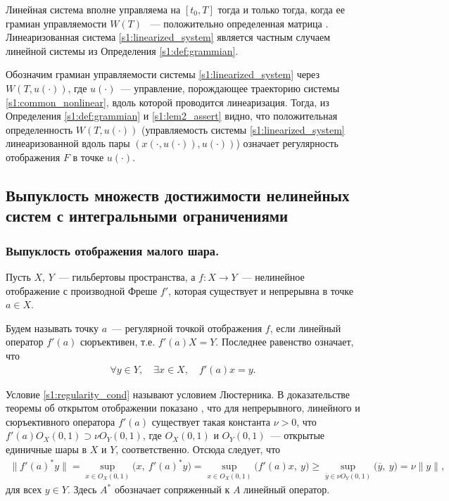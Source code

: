 \documentclass[../main.tex]{subfiles}
\begin{document}
Линейная система вполне управляема на  $ [t_0, T] $ тогда и только тогда, когда ее грамиан управляемости $W(T)$ ~--- положительно определенная матрица \cite[c. 176]{Chen}.
Линеаризованная система \eqref{s1:linearized_system} является частным случаем линейной системы из Определения \ref{s1:def:grammian}. 
    
Обозначим грамиан управляемости системы \eqref{s1:linearized_system} через $W(T,u(\cdot))$, где $u(\cdot)$~--- управление, порождающее траекторию системы \eqref{s1:common_nonlinear}, вдоль которой проводится линеаризация.
Тогда, из Определения \ref{s1:def:grammian} и \eqref{s1:lem2_assert} видно, что положительная определенность $W(T,u(\cdot))$ (управляемость системы \eqref{s1:linearized_system} линеаризованной вдоль пары $\left( x(\cdot,u(\cdot)),u(\cdot)\right)   $) означает регулярность отображения $F$ в точке $u(\cdot) $. 
    
\subsection{Выпуклость множеств достижимости нелинейных систем с интегральными ограничениями}
\subsubsection{Выпуклость отображения малого шара.}
Пусть $X$, $Y$~--- гильбертовы пространства, а $f: X \rightarrow Y$~--- нелинейное отображение с производной Фреше $f'$, которая существует и непрерывна в точке $a \in X$.
    
Будем называть точку $a$~--- регулярной точкой отображения $f$, если линейный оператор $f'(a)$ сюръективен, т.е. $ f'(a) X = Y $.
Последнее равенство означает, что 
\begin{gather}\label{s1:regularity_cond}
    \forall y \in Y, \quad \exists x \in X, \quad f'(a) x = y.
\end{gather}

Условие \eqref{s1:regularity_cond} называют условием Люстерника\cite{Dmitruk1980}.
В доказательстве теоремы об открытом отображении показано \cite[Теорема 2.11, Теорема 4.13]{Rudin}, что для непрерывного, линейного и сюръективного оператора $f'(a)$ существует такая константа $\nu > 0$, что $f'(a) O_X(0, 1) \supset \nu O_Y(0, 1)$, где $ O_X(0, 1)$ и  $O_Y(0, 1)$~--- открытые единичные шары в $X$ и $Y$, соответственно.
Отсюда следует, что
\begin{gather}\label{s1:lyusternik_condition_proof}
    \| f'(a)^* y \| = \sup\limits_{x \in O_X(0, 1)} \big(x,\  f'(a)^* y\big) =  \sup\limits_{x \in O_X(0, 1)} \big(f'(a) x,\  y\big) \geqslant  \sup\limits_{\overline{y} \in \nu O_Y(0, 1)} \big(\overline{y},\  y\big) = \nu \|y\|,
\end{gather}
для всех $y \in Y$.
Здесь $A^*$ обозначает сопряженный к $A$ линейный оператор.
    
\end{document}
